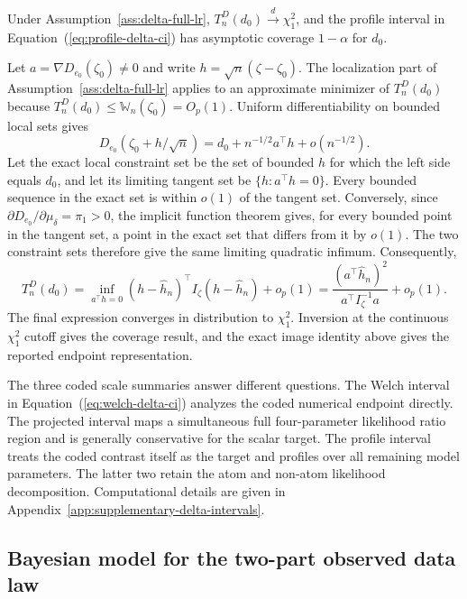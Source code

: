 \documentclass[11pt]{article}
\begin{document}
\begin{mainproposition}\label{prop:delta-profile-lr-interval}
Under Assumption~\ref{ass:delta-full-lr}, $T_n^D(d_0)\overset{d}{\longrightarrow}\chi^2_1$, and the profile interval in Equation~(\ref{eq:profile-delta-ci}) has asymptotic coverage $1-\alpha$ for $d_0$.
\end{mainproposition}

\begin{mainproof}
Let $a=\nabla D_{e_0}(\zeta_0)\neq0$ and write $h=\sqrt n(\zeta-\zeta_0)$. The localization part of Assumption~\ref{ass:delta-full-lr} applies to an approximate minimizer of $T_n^D(d_0)$ because $T_n^D(d_0)\leq\mathbb{W}_n(\zeta_0)=O_p(1)$. Uniform differentiability on bounded local sets gives
\[
  D_{e_0}(\zeta_0+h/\sqrt n)
  =
  d_0+n^{-1/2}a^\top h+o(n^{-1/2}).
\]
Let the exact local constraint set be the set of bounded $h$ for which the left side equals $d_0$, and let its limiting tangent set be $\{h:a^\top h=0\}$. Every bounded sequence in the exact set is within $o(1)$ of the tangent set. Conversely, since $\partial D_{e_0}/\partial\mu_\delta=\pi_1>0$, the implicit function theorem gives, for every bounded point in the tangent set, a point in the exact set that differs from it by $o(1)$. The two constraint sets therefore give the same limiting quadratic infimum. Consequently,
\[
  T_n^D(d_0)
  =
  \inf_{a^\top h=0}
  (h-\widehat{h}_n)^\top I_\zeta(h-\widehat{h}_n)+o_p(1)
  =
  \frac{(a^\top\widehat{h}_n)^2}{a^\top I_\zeta^{-1}a}+o_p(1).
\]
The final expression converges in distribution to $\chi^2_1$. Inversion at the continuous $\chi^2_1$ cutoff gives the coverage result, and the exact image identity above gives the reported endpoint representation.
\end{mainproof}

The three coded scale summaries answer different questions. The Welch interval in Equation~(\ref{eq:welch-delta-ci}) analyzes the coded numerical endpoint directly. The projected interval maps a simultaneous full four-parameter likelihood ratio region and is generally conservative for the scalar target. The profile interval treats the coded contrast itself as the target and profiles over all remaining model parameters. The latter two retain the atom and non-atom likelihood decomposition. Computational details are given in Appendix~\ref{app:supplementary-delta-intervals}.



\subsection{Bayesian model for the two-part observed data law}
\label{sec:bayesian-two-group}
\end{document}
